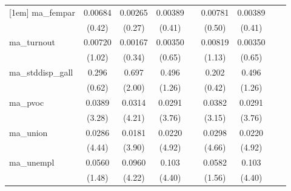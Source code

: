 {\begin{tabular}{l*{8}{c}}
[1em]
ma\_fempar   &     0.00684         &     0.00265         &     0.00389         &                     &     0.00781         &     0.00389         &                     &                     \\
            &      (0.42)         &      (0.27)         &      (0.41)         &                     &      (0.50)         &      (0.41)         &                     &                     \\
[1em]
ma\_turnout  &     0.00720         &     0.00167         &     0.00350         &                     &     0.00819         &     0.00350         &                     &                     \\
            &      (1.02)         &      (0.34)         &      (0.65)         &                     &      (1.13)         &      (0.65)         &                     &                     \\
[1em]
ma\_stddisp\_gall&       0.296         &       0.697\sym{*}  &       0.496         &                     &       0.202         &       0.496         &                     &                     \\
            &      (0.62)         &      (2.00)         &      (1.26)         &                     &      (0.42)         &      (1.26)         &                     &                     \\
[1em]
ma\_pvoc     &      0.0389\sym{**} &      0.0314\sym{***}&      0.0291\sym{***}&                     &      0.0382\sym{**} &      0.0291\sym{***}&                     &                     \\
            &      (3.28)         &      (4.21)         &      (3.76)         &                     &      (3.15)         &      (3.76)         &                     &                     \\
[1em]
ma\_union    &      0.0286\sym{***}&      0.0181\sym{***}&      0.0220\sym{***}&                     &      0.0298\sym{***}&      0.0220\sym{***}&                     &                     \\
            &      (4.44)         &      (3.90)         &      (4.92)         &                     &      (4.66)         &      (4.92)         &                     &                     \\
[1em]
ma\_unempl   &      0.0560         &      0.0960\sym{***}&       0.103\sym{***}&                     &      0.0582         &       0.103\sym{***}&                     &                     \\
            &      (1.48)         &      (4.22)         &      (4.40)         &                     &      (1.56)         &      (4.40)         &                     &                     \\

\end{tabular}}
